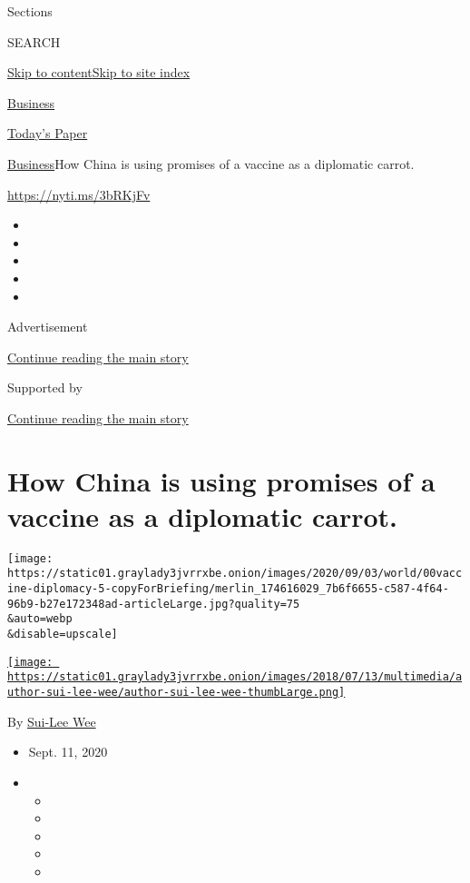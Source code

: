 Sections

SEARCH

\protect\hyperlink{site-content}{Skip to
content}\protect\hyperlink{site-index}{Skip to site index}

\href{https://www.nytimes3xbfgragh.onion/section/business}{Business}

\href{https://myaccount.nytimes3xbfgragh.onion/auth/login?response_type=cookie\&client_id=vi}{}

\href{https://www.nytimes3xbfgragh.onion/section/todayspaper}{Today's
Paper}

\href{/section/business}{Business}\textbar{}How China is using promises
of a vaccine as a diplomatic carrot.

\url{https://nyti.ms/3bRKjFv}

\begin{itemize}
\item
\item
\item
\item
\item
\end{itemize}

Advertisement

\protect\hyperlink{after-top}{Continue reading the main story}

Supported by

\protect\hyperlink{after-sponsor}{Continue reading the main story}

\hypertarget{how-china-is-using-promises-of-a-vaccine-as-a-diplomatic-carrot}{%
\section{How China is using promises of a vaccine as a diplomatic
carrot.}\label{how-china-is-using-promises-of-a-vaccine-as-a-diplomatic-carrot}}

\texttt{[image: https://static01.graylady3jvrrxbe.onion/images/2020/09/03/world/00vaccine-diplomacy-5-copyForBriefing/merlin\_174616029\_7b6f6655-c587-4f64-96b9-b27e172348ad-articleLarge.jpg?quality=75\\\&auto=webp\\\&disable=upscale]}

\href{https://www.nytimes3xbfgragh.onion/by/sui-lee-wee}{\texttt{[image: https://static01.graylady3jvrrxbe.onion/images/2018/07/13/multimedia/author-sui-lee-wee/author-sui-lee-wee-thumbLarge.png]}}

By \href{https://www.nytimes3xbfgragh.onion/by/sui-lee-wee}{Sui-Lee Wee}

\begin{itemize}
\item
  Sept. 11, 2020
\item
  \begin{itemize}
  \item
  \item
  \item
  \item
  \item
  \end{itemize}
\end{itemize}

